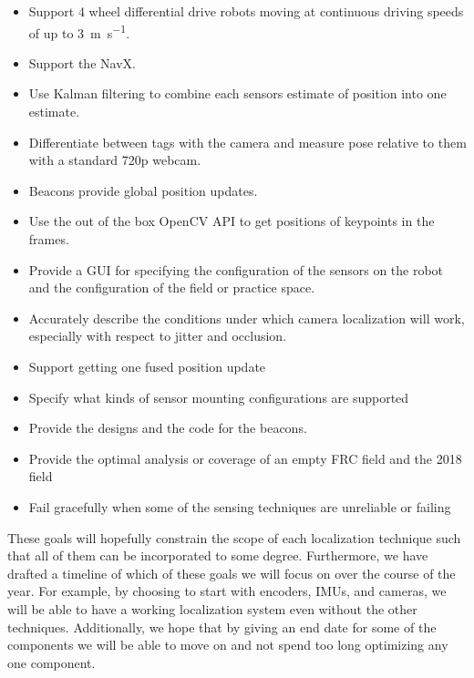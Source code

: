 \documentclass{article}
\begin{document}
    \begin{itemize}
      \item Support 4 wheel differential drive robots moving at continuous driving speeds of up to \SI{3}{\meter\per\second}.
      \item Support the NavX.
      \item Use Kalman filtering to combine each sensors estimate of position into one estimate.
      \item Differentiate between tags with the camera and measure pose relative to them with a standard 720p webcam.
      \item Beacons provide global position updates.
      \item Use the out of the box OpenCV API to get positions of keypoints in the frames.
      \item Provide a GUI for specifying the configuration of the sensors on the robot and the configuration of the field or practice space.
      \item Accurately describe the conditions under which camera localization will work, especially with respect to jitter and occlusion.
      \item Support getting one fused position update
      \item Specify what kinds of sensor mounting configurations are supported
      \item Provide the designs and the code for the beacons.
      \item Provide the optimal analysis or coverage of an empty FRC field and the 2018 field
      \item Fail gracefully when some of the sensing techniques are unreliable or failing
    \end{itemize}

    These goals will hopefully constrain the scope of each localization technique such that all of them can be incorporated to some degree. Furthermore, we have drafted a timeline of which of these goals we will focus on over the course of the year. For example, by choosing to start with encoders, IMUs, and cameras, we will be able to have a working localization system even without the other techniques. Additionally, we hope that by giving an end date for some of the components we will be able to move on and not spend too long optimizing any one component.
\end{document}
